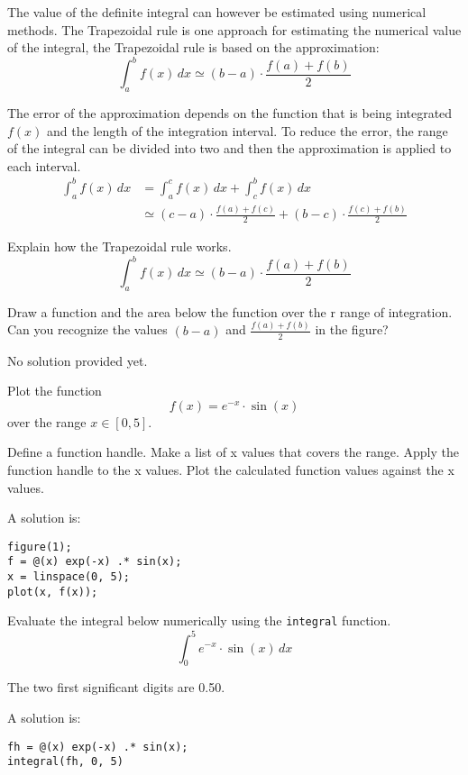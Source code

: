 The value of the definite integral can however be estimated
using numerical methods.
The Trapezoidal rule is one approach for estimating the 
numerical value of the integral, the Trapezoidal rule 
is based on the approximation:
\[
\int_a^b f(x) \, dx \simeq (b - a) \cdot \frac{f(a) + f(b)}{2}
\]

The error of the approximation depends on the function that 
is being integrated $f(x)$ and the length of the integration 
interval.
To reduce the error, the range of the integral can be divided 
into two and then the approximation is applied to each interval.
\begin{align*}
\int_a^b f(x) \, dx 
& = \int_a^c f(x) \, dx + \int_c^b f(x) \, dx \\
& \simeq (c - a) \cdot \frac{f(a) + f(c)}{2} + (b - c) \cdot \frac{f(c) + f(b)}{2}
\end{align*}


\begin{ex}
Explain how the Trapezoidal rule works.
\[
\int_a^b f(x) \, dx \simeq (b - a) \cdot \frac{f(a) + f(b)}{2}
\]
\begin{hint}
Draw a function and the area below the function over the r
range of integration.
Can you recognize the values $(b - a)$ and $\frac{f(a) + f(b)}{2}$
in the figure?
\end{hint}
\begin{sol}
No solution provided yet.
\end{sol}
\end{ex}

\begin{ex}
Plot the function 
\[
f(x) = e^{-x} \cdot \sin(x)
\]
over the range $x \in [0, 5]$.
\begin{hint}
Define a function handle.
Make a list of x values that covers the range.
Apply the function handle to the x values.
Plot the calculated function values against the x values.
\end{hint}
\begin{sol}
A solution is:
\begin{lstlisting}
figure(1);
f = @(x) exp(-x) .* sin(x);
x = linspace(0, 5);
plot(x, f(x));
\end{lstlisting}
\end{sol}
\end{ex}


\begin{ex}\label{exTrapezRuleReference}%
Evaluate the integral below numerically using the \verb!integral! function.
\[
\int_0^5 e^{-x} \cdot \sin(x) \, dx
\]
\begin{hint}
The two first significant digits are 0.50.
\end{hint}
\begin{sol}
A solution is:
\begin{verbatim}
fh = @(x) exp(-x) .* sin(x);
integral(fh, 0, 5)
\end{verbatim}
\end{sol}
\end{ex}

